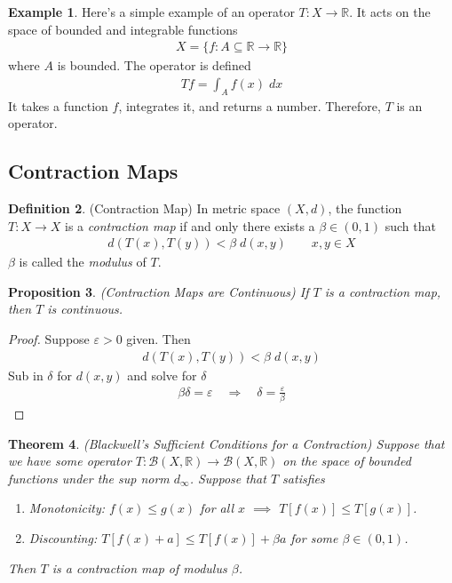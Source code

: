 \documentclass[12pt]{article}
\numberwithin{equation}{section} %
\theoremstyle{plain}
\newtheorem{thm}{Theorem}[section]
\newtheorem{prop}[thm]{Proposition}
\theoremstyle{definition}
\newtheorem{defn}[thm]{Definition}
\newtheorem{ex}[thm]{Example}
\theoremstyle{remark}
\newcommand{\R}{\mathbb{R}}
\begin{document}
\begin{ex}
Here's a simple example of an operator $T:X\rightarrow \R$. It acts on
the space of bounded and integrable functions
\begin{align*}
  X = \{f: A\subseteq \R \rightarrow \R\}
\end{align*}
where $A$ is bounded.
The operator is defined
\begin{align*}
  Tf = \int_A f(x) \; dx
\end{align*}
It takes a function $f$, integrates it, and returns a number.
Therefore, $T$ is an operator.
\end{ex}

\subsection{Contraction Maps}

\begin{defn}{(Contraction Map)}
In metric space $(X,d)$, the function $T: X\rightarrow X$ is a
\emph{contraction map} if and only there exists a $\beta \in (0,1)$ such
that
\begin{align*}
  d(T(x), T(y)) < \beta \; d(x,y)
  \qquad x,y\in X
\end{align*}
$\beta$ is called the \emph{modulus} of $T$.
\end{defn}

\begin{prop}{\emph{(Contraction Maps are Continuous)}}
If $T$ is a contraction map, then $T$ is continuous.
\end{prop}
\begin{proof}
Suppose $\varepsilon>0$ given. Then
\begin{align*}
  d(T(x),T(y)) < \beta \; d(x,y)
\end{align*}
Sub in $\delta$ for $d(x,y)$ and solve for $\delta$
\begin{align*}
  \beta \delta = \varepsilon
  \quad\Rightarrow\quad
  \delta = \frac{\varepsilon}{\beta}
\end{align*}
\end{proof}


\begin{thm}{\emph{(Blackwell's Sufficient Conditions for a Contraction)}}
Suppose that we have some operator
$T:\mathscr{B}(X,\R)\rightarrow\mathscr{B}(X,\R)$ on the space of
bounded functions under the sup norm $d_\infty$.
Suppose that $T$ satisfies
\begin{enumerate}
  \item \emph{Monotonicity}: $f(x) \leq g(x)$ for all $x$
    $\implies$ $T[f(x)] \leq T[g(x)]$.
  \item \emph{Discounting}: $T[f(x)+a] \leq T[f(x)] + \beta a$ for some
    $\beta\in(0,1)$.
\end{enumerate}
Then $T$ is a contraction map of modulus $\beta$.
\end{thm}
\end{document}
